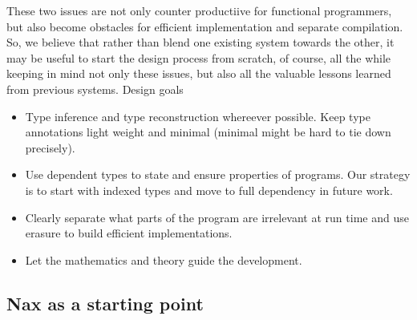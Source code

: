 These two issues are not only counter productiive for functional programmers, but also
become obstacles for efficient  implementation and separate
compilation. So, we believe that rather than blend one existing system
towards the other, it may be useful to start the design process from scratch,
of course, all the while keeping in mind not only these issues, but also
all the valuable lessons learned from previous systems. Design goals
\begin{itemize}
\item Type inference and type reconstruction whereever possible. Keep type
annotations light weight and minimal (minimal might be hard to tie down precisely).

\item Use dependent types to state and ensure properties of programs. Our strategy
is to start with indexed types and move to full dependency in future work.

\item Clearly separate what parts of the program are irrelevant at run time and
use erasure to build efficient implementations.

\item Let the mathematics and theory guide the development.
\end{itemize}

 

\subsection{Nax as a starting point}
 
